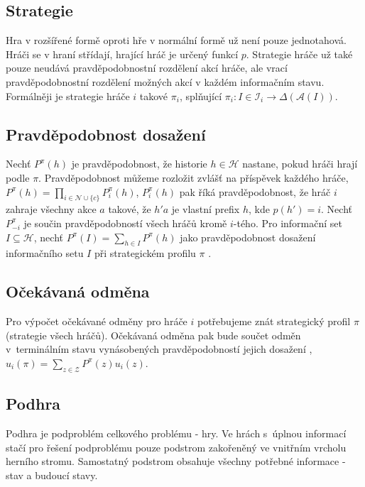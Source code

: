 \subsection{Strategie}

Hra v rozšířené formě oproti hře v normální formě už není pouze jednotahová. Hráči se v hraní střídají, hrající hráč je určený funkcí $p$. Strategie hráče už také pouze neudává pravděpodobnostní rozdělení akcí hráče, ale vrací pravděpodobnostní rozdělení možných akcí v každém informačním stavu. Formálněji je strategie hráče $i$ takové $\pi_i$, splňující $\pi_i: I \in \mathcal{I}_i \to \Delta(\mathcal{A}(I))$.

\subsection{Pravděpodobnost dosažení}\label{sub:prob}

Nechť $P^\pi(h)$ je pravděpodobnost, že historie $h \in \mathcal{H}$ nastane, pokud hráči hrají podle $\pi$. Pravděpodobnost můžeme rozložit zvlášť na příspěvek každého hráče, $P^\pi(h) = \prod_{i \in \mathcal{N} \cup \{c\}}P^\pi_i(h)$, $P^\pi_i(h)$ pak říká pravděpodobnost, že hráč $i$ zahraje všechny akce $a$ takové, že $h'a$ je vlastní prefix $h$, kde $p(h') = i$. Nechť $P_{-i}^\pi$ je součin pravděpodobností všech hráčů kromě $i$-tého. Pro informační set $I \subseteq \mathcal{H}$, nechť $P^\pi(I) = \sum_{h \in I} P^\pi(h)$ jako pravděpodobnost dosažení informačního setu $I$ při strategickém profilu $\pi$ \cite{RegretInImperfectInformation}. 

\subsection{Očekávaná odměna}

Pro výpočet očekávané odměny pro hráče $i$ potřebujeme znát strategický profil $\pi$ (strategie všech hráčů). Očekávaná odměna pak bude součet odměn v~terminálním stavu vynásobených pravděpodobností jejich dosažení \cite{RegretInImperfectInformation}, $u_i(\pi) = \sum_{z \in \mathcal{Z}} P^\pi(z)u_i(z)$. 


\subsection{Podhra}

Podhra je podproblém celkového problému - hry. Ve hrách s~úplnou informací stačí pro řešení podproblému  pouze podstrom zakořeněný ve vnitřním vrcholu herního stromu. Samostatný podstrom obsahuje všechny potřebné informace - stav a budoucí stavy. 

